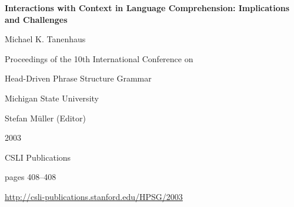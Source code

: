 \documentclass[a4paper,11pt]{article}
\begin{document}
\begin{center}
  {\huge\bf Interactions with Context in Language Comprehension: Implications and Challenges\par}

  \bigskip

  {\LARGE Michael K. Tanenhaus\par}

  \vspace*{3\bigskipamount}

  Proceedings of the 10th International Conference on\par Head-Driven Phrase Structure Grammar

  \bigskip

  Michigan State University

  \medskip

  Stefan M{\"u}ller (Editor)

  \medskip

  2003

  \medskip

  CSLI Publications

  \medskip

  pages 408--408

  \medskip

  \url{http://csli-publications.stanford.edu/HPSG/2003}
\end{center}

\newpage

        
\end{document}
